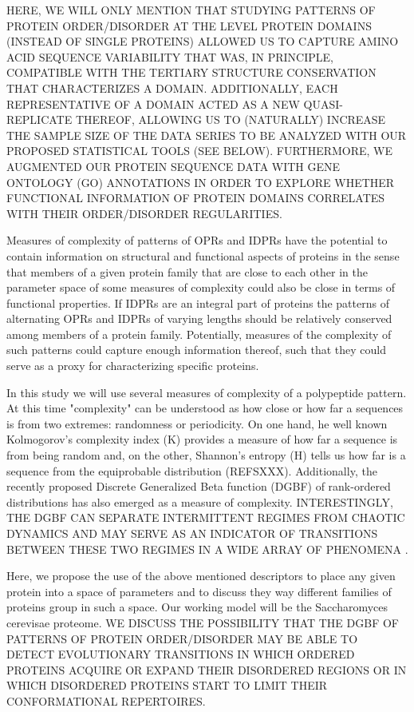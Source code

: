 \documentclass[preprint,12pt]{elsarticle}
\begin{document}
HERE, WE WILL ONLY MENTION THAT STUDYING PATTERNS OF PROTEIN ORDER/DISORDER AT THE LEVEL PROTEIN DOMAINS (INSTEAD OF SINGLE PROTEINS) ALLOWED US TO CAPTURE  AMINO ACID SEQUENCE VARIABILITY  THAT WAS, IN PRINCIPLE, COMPATIBLE WITH THE TERTIARY STRUCTURE CONSERVATION THAT CHARACTERIZES A DOMAIN. ADDITIONALLY,  EACH REPRESENTATIVE OF A DOMAIN ACTED AS A NEW QUASI-REPLICATE THEREOF, ALLOWING US TO (NATURALLY) INCREASE THE SAMPLE SIZE OF THE DATA SERIES TO BE ANALYZED WITH OUR PROPOSED STATISTICAL TOOLS (SEE BELOW). FURTHERMORE, WE AUGMENTED OUR PROTEIN SEQUENCE DATA WITH GENE ONTOLOGY (GO) ANNOTATIONS IN ORDER TO EXPLORE WHETHER FUNCTIONAL INFORMATION OF PROTEIN DOMAINS CORRELATES WITH  THEIR ORDER/DISORDER REGULARITIES.

Measures of complexity of patterns of OPRs and IDPRs have the potential to contain information on structural and functional aspects of proteins in the sense that members of a given protein family that are close to each other in the parameter space of some measures of complexity could also be close in terms of functional properties. If IDPRs are an integral part of proteins the patterns of alternating OPRs and IDPRs of varying lengths should be relatively conserved among members of a protein family. Potentially, measures of the complexity of such patterns could capture enough information thereof, such that they could serve as a proxy for characterizing specific proteins.

In this study we will use several measures of complexity of a polypeptide pattern. At this time "complexity" can be understood as how close or how far a sequences is from two extremes: randomness or periodicity. On one hand, he well known Kolmogorov’s complexity index (K) provides a measure of how far a sequence is from being random and, on the other,  Shannon’s entropy (H) tells us how far is a sequence from the equiprobable distribution (REFSXXX). Additionally, the recently proposed Discrete Generalized Beta function (DGBF)  of rank-ordered distributions has also emerged as a measure of complexity. INTERESTINGLY, THE DGBF CAN SEPARATE INTERMITTENT REGIMES FROM CHAOTIC DYNAMICS AND MAY SERVE AS AN INDICATOR OF TRANSITIONS BETWEEN THESE TWO REGIMES IN A WIDE ARRAY OF PHENOMENA  \cite{martinez2009universalit}.

Here, we propose  the use of the above mentioned descriptors to place any given protein into a space of parameters and to discuss they way different families of proteins group in such a space. Our working model will be the Saccharomyces cerevisae proteome. WE DISCUSS THE POSSIBILITY THAT THE DGBF OF PATTERNS OF PROTEIN ORDER/DISORDER MAY BE ABLE TO DETECT EVOLUTIONARY TRANSITIONS IN WHICH ORDERED PROTEINS ACQUIRE OR EXPAND THEIR DISORDERED REGIONS OR IN WHICH DISORDERED PROTEINS START TO LIMIT THEIR CONFORMATIONAL REPERTOIRES.
\end{document}
